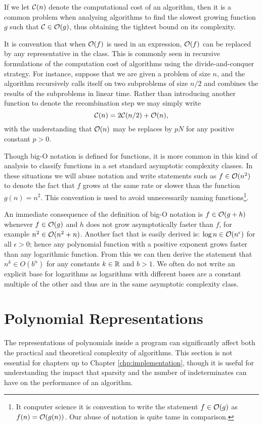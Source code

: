 If we let $\mathcal C(n)$ denote the computational cost of an algorithm, then it is a common problem when analysing algorithms to find the slowest growing function $g$ such that $\mathcal C \in \mathcal O(g)$, thus obtaining the tightest bound on its complexity.

It is convention that when $\mathcal O(f)$ is used in an expression, $\mathcal O(f)$ can be replaced by any representative in the class. This is commonly seen in recursive formulations of the computation cost of algorithms using the divide-and-conquer strategy. For instance, suppose that we are given a problem of size $n$, and the algorithm recursively calls itself on two subproblems of size $n/2$ and combines the results of the subproblems in linear time. Rather than introducing another function to denote the recombination step we may simply write
\[
    \mathcal C(n) = 2\mathcal C(n/2) + \mathcal O(n),
\]
with the understanding that $\mathcal O(n)$ may be replaces by $pN$ for any positive constant $p > 0$.

Though big-O notation is defined for functions, it is more common in this kind of analysis to classify functions in a set standard asymptotic complexity classes. In these situations we will abuse notation and write statements such as $f \in \mathcal O(n^2)$ to denote the fact that $f$ grows at the same rate or slower than the function $g(n) = n^2$. This convention is used to avoid unnecessarily naming functions\footnote{It computer science it is convention to write the statement $f \in \mathcal O(g)$ as $f(n) = \mathcal O(g(n))$. Our abuse of notation is quite tame in comparison.}.

An immediate consequence of the definition of big-O notation is $f \in \mathcal O(g + h)$ whenever $f \in \mathcal O(g)$ and $h$ does not grow asymptotically faster than $f$, for example $n^2 \in \mathcal O(n^2 + n)$. Another fact that is easily derived is: $\log n \in \mathcal O(n^\epsilon)$ for all $\epsilon > 0$; hence any polynomial function with a positive exponent grows faster than any logarithmic function. From this we can then derive the statement that $n^k \in O(b^n)$ for any constants $k \in {\mathbb R}$ and $b > 1$. We often do not write an explicit base for logarithms as logarithms with different bases are a constant multiple of the other and thus are in the same asymptotic complexity class.

\section{Polynomial Representations}

The representations of polynomials inside a program can significantly affect both the practical and theoretical complexity of algorithms. This section is not essential for chapters up to Chapter \ref{chp:implementation}, though it is useful for understanding the impact that sparsity and the number of indeterminates can have on the performance of an algorithm.

